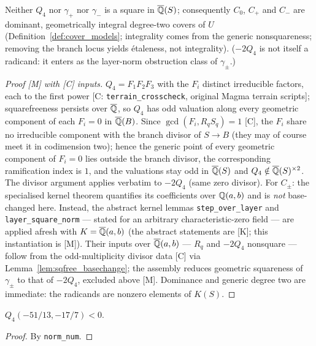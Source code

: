 \begin{proposition}\label{prop:geomint}
Neither $Q_{4}$ nor $\gamma_{+}$ nor $\gamma_{-}$ is a square in
$\overline{\mathbb{Q}}(S)$; consequently $C_{0}$, $C_{+}$ and $C_{-}$ are dominant,
geometrically integral degree-two covers of $U$ (Definition~\ref{def:cover_models};
integrality comes from the generic nonsquareness; removing the branch locus
yields \'etaleness, not integrality).  ($-2Q_{4}$ is not itself a radicand: it enters as
the layer-norm obstruction class of $\gamma_{\pm}$.)
\end{proposition}
\begin{proof}[Proof {[M]} with {[C]} inputs]
$Q_{4}=F_{1}F_{2}F_{3}$ with the $F_{i}$ distinct irreducible factors, each to
the first power [C: \texttt{terrain\_crosscheck}, original Magma terrain
scripts]; squarefreeness persists over $\overline{\mathbb{Q}}$, so $Q_{4}$ has odd
valuation along every geometric component of each $F_{i}=0$ in
$\overline{\mathbb{Q}}(B)$.  Since $\gcd(F_{i},R_{q}S_{q})=1$ [C], the $F_{i}$ share no irreducible
component with the branch divisor of $S\to B$ (they may of course meet it in
codimension two); hence the generic point of every geometric component of
$F_{i}=0$ lies outside the branch divisor, the corresponding ramification index
is $1$, and the valuations stay odd in $\overline{\mathbb{Q}}(S)$ and
$Q_{4}\notin\overline{\mathbb{Q}}(S)^{\times2}$.  The divisor argument applies verbatim
to $-2Q_{4}$ (same zero divisor).  For $C_{\pm}$: the specialised kernel theorem quantifies its coefficients over
$\mathbb{Q}(a,b)$ and is \emph{not} base-changed here.  Instead, the abstract kernel
lemmas \texttt{step\_over\_layer} and \texttt{layer\_square\_norm} --- stated for
an arbitrary characteristic-zero field --- are applied afresh with
$K=\overline{\mathbb{Q}}(a,b)$ (the abstract statements are [K]; this instantiation is
[M]).  Their inputs over $\overline{\mathbb{Q}}(a,b)$ --- $R_{q}$ and $-2Q_{4}$ nonsquare
--- follow from the odd-multiplicity divisor data [C] via
Lemma~\ref{lem:sqfree_basechange}; the assembly reduces geometric squareness of
$\gamma_{\pm}$ to that of $-2Q_{4}$, excluded above [M].  Dominance and generic degree two are
immediate: the radicands are nonzero elements of $K(S)$.
\end{proof}

\begin{lemma}\label{Q4_neg}\leanok
{}
$Q_{4}(-51/13,-17/7)<0$.
\end{lemma}
\begin{proof}\leanok
By \texttt{norm\_num}.
\end{proof}

